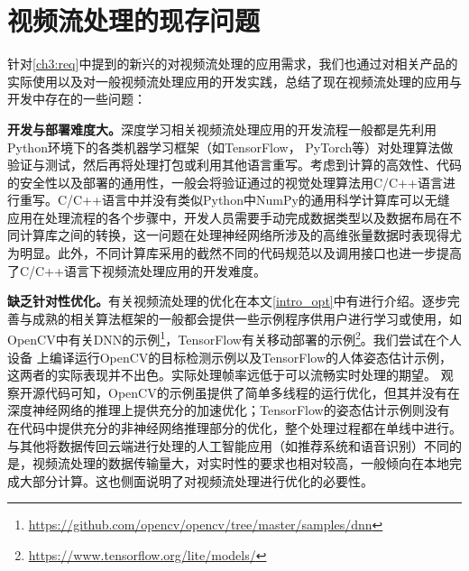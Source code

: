 \section{视频流处理的现存问题}\label{ch3:problems}
针对\ref{ch3:req}中提到的新兴的对视频流处理的应用需求，我们也通过对相关产品的实际使用以及对一般视频流处理应用的开发实践，总结了现在视频流处理的应用与开发中存在的一些问题：\par
\textbf{开发与部署难度大。}深度学习相关视频流处理应用的开发流程一般都是先利用Python环境下的各类机器学习框架（如TensorFlow， PyTorch等）对处理算法做验证与测试，然后再将处理打包或利用其他语言重写。考虑到计算的高效性、代码的安全性以及部署的通用性，一般会将验证通过的视觉处理算法用C/C++语言进行重写。C/C++语言中并没有类似Python中NumPy\cite{oliphant2006guide}的通用科学计算库可以无缝应用在处理流程的各个步骤中，开发人员需要手动完成数据类型以及数据布局在不同计算库之间的转换，这一问题在处理神经网络所涉及的高维张量数据时表现得尤为明显。此外，不同计算库采用的截然不同的代码规范以及调用接口也进一步提高了C/C++语言下视频流处理应用的开发难度。\par
\textbf{缺乏针对性优化。}有关视频流处理的优化在本文\ref{intro_opt}中有进行介绍。逐步完善与成熟的相关算法框架的一般都会提供一些示例程序供用户进行学习或使用，如OpenCV中有关DNN的示例\footnote{\url{https://github.com/opencv/opencv/tree/master/samples/dnn}}，TensorFlow有关移动部署的示例\footnote{\url{https://www.tensorflow.org/lite/models/}}。我们尝试在个人设备%
上编译运行OpenCV的目标检测示例以及TensorFlow的人体姿态估计示例，这两者的实际表现并不出色。实际处理帧率远低于可以流畅实时处理的期望。
观察开源代码可知，OpenCV的示例虽提供了简单多线程的运行优化，但其并没有在深度神经网络的推理上提供充分的加速优化；TensorFlow的姿态估计示例则没有在代码中提供充分的非神经网络推理部分的优化，整个处理过程都在单线中进行。与其他将数据传回云端进行处理的人工智能应用（如推荐系统和语音识别）不同的是，视频流处理的数据传输量大，对实时性的要求也相对较高，一般倾向在本地完成大部分计算。这也侧面说明了对视频流处理进行优化的必要性。

